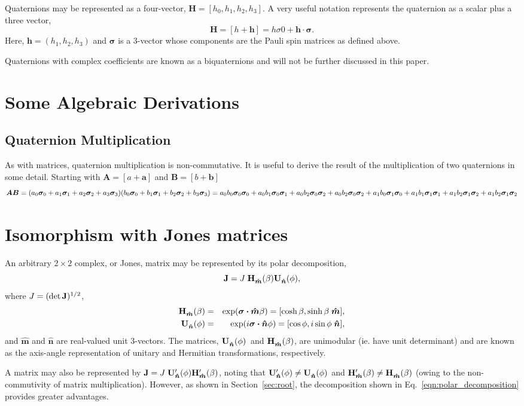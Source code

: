 \documentclass[12pt]{article}
\newcommand\boost[1]{\ensuremath{ {\bf H}^{#1}_{\bm{\hat m}}(\beta) }}
\newcommand\rotat[1]{\ensuremath{ {\bf U}^{#1}_{\bm{\hat n}}(\phi) }}
\newcommand\pauli[1]{\ensuremath{ \bm{\sigma}_{\rm #1} }}
\begin{document}
Quaternions may be represented as a four-vector, $\bm{H}=[h_0,h_1,h_2,h_3]$.
A very useful notation represents the quaternion as a scalar plus a 
three vector, 
\begin{equation}
\bm{H}=[h+\bm{h}] = h\sigma{0} + \bm{h\cdot\sigma}.
\end{equation}
Here, $\bm{h}=(h_1,h_2,h_3)$ and $\bm\sigma$ is a 3-vector whose
components are the Pauli spin matrices as defined above.

Quaternions with complex coefficients are known as a biquaternions and
will not be further discussed in this paper.

\section{Some Algebraic Derivations}

\subsection{Quaternion Multiplication}
As with matrices, quaternion multiplication is non-commutative.  It is
useful to derive the result of the multiplication of two quaternions in some
detail. Starting with $\bm{A}=[a+\bm{a}]$ and $\bm{B}=[b+\bm{b}]$
\[
\bm{A}\bm{B}=
(a_0\pauli{0} + a_1\pauli{1} + a_2\pauli{2} + a_3\pauli{3})
(b_0\pauli{0} + b_1\pauli{1} + b_2\pauli{2} + b_3\pauli{3}) \\
= a_0b_0\pauli{0}\pauli{0} + a_0b_1\pauli{0}\pauli{1}
	+ a_0b_2\pauli{0}\pauli{2} + a_0b_2\pauli{0}\pauli{2} \\
+ a_1b_0\pauli{1}\pauli{0} + a_1b_1\pauli{1}\pauli{1}
	+ a_1b_2\pauli{1}\pauli{2} + a_1b_2\pauli{1}\pauli{2}
\]

\section{Isomorphism with Jones matrices}

An arbitrary $2\times2$ complex, or Jones, matrix may be represented
by its polar decomposition,
\begin{equation}
{\bf J} = J \; \boost{} \rotat{},
\label{eqn:polar_decomposition}
\end{equation}
where $J=(\det{\bf J})^{1/2}$,
\begin{eqnarray}
\boost{} &=& \exp(\bm{\sigma\cdot}\bm{\hat m}\beta)
        = [\cosh\beta,\sinh\beta\;\bm{\hat m}],
\label{eqn:boost} \\
\rotat{} &=& \exp(i\bm{\sigma\cdot}\bm{\hat n}\phi)
        = [\cos\phi,i\sin\phi\;\bm{\hat n}],
\label{eqn:rotation}
\end{eqnarray}
and $\bm{\hat m}$ and $\bm{\hat n}$ are real-valued unit 3-vectors.
The matrices, \rotat{}\ and \boost{}, are unimodular (ie. have unit
determinant) and are known as the axis-angle representation of unitary
and Hermitian transformations, respectively.

A matrix may also be represented by ${\bf J} = J \; \rotat{\prime}
\boost{\prime}$, noting that $\rotat{\prime}\ne\rotat{}$ and
$\boost{\prime}\ne\boost{}$ (owing to the non-commutivity of matrix
multiplication).  However, as shown in Section~\ref{sec:root}, the
decomposition shown in Eq.~\ref{eqn:polar_decomposition} provides greater
advantages.
\end{document}
